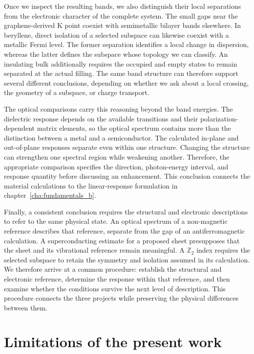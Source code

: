 Once we inspect the resulting bands, we also distinguish their local separations from the electronic character of the complete system.
The small gaps near the graphene-derived $\mathrm{K}$ point coexist with semimetallic bilayer bands elsewhere.
In beryllene, direct isolation of a selected subspace can likewise coexist with a metallic Fermi level.
The former separation identifies a local change in dispersion, whereas the latter defines the subspace whose topology we can classify.
An insulating bulk additionally requires the occupied and empty states to remain separated at the actual filling.
The same band structure can therefore support several different conclusions, depending on whether we ask about a local crossing, the geometry of a subspace, or charge transport.

The optical comparisons carry this reasoning beyond the band energies.
The dielectric response depends on the available transitions and their polarization-dependent matrix elements, so the optical spectrum contains more than the distinction between a metal and a semiconductor.
The calculated in-plane and out-of-plane responses separate even within one structure.
Changing the structure can strengthen one spectral region while weakening another.
Therefore, the appropriate comparison specifies the direction, photon-energy interval, and response quantity before discussing an enhancement.
This conclusion connects the material calculations to the linear-response formulation in chapter~\ref{cha:fundamentals_b}.

Finally, a consistent conclusion requires the structural and electronic descriptions to refer to the same physical state.
An optical spectrum of a non-magnetic reference describes that reference, separate from the gap of an antiferromagnetic calculation.
A superconducting estimate for a proposed sheet presupposes that the sheet and its vibrational reference remain meaningful.
A $\mathbb{Z}_2$ index requires the selected subspace to retain the symmetry and isolation assumed in its calculation.
We therefore arrive at a common procedure: establish the structural and electronic reference, determine the response within that reference, and then examine whether the conditions survive the next level of description.
This procedure connects the three projects while preserving the physical differences between them.

\FloatBarrier
\section{Limitations of the present work}
\label{sec:conclusions_limitations}

